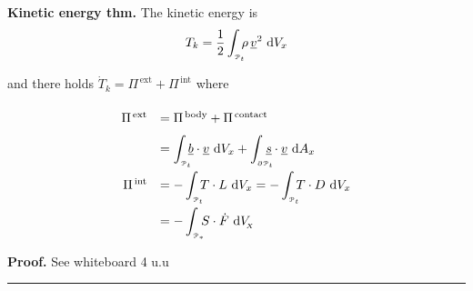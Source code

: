 \textbf{Kinetic energy thm.} The kinetic energy is
\begin{equation*}
T_k=\frac{1}{2} \int_{_{\EuScript{P}_t}}\!\!\! \rho\,\underline{v}^2\ \mathrm{d} V_x
\end{equation*}

and there holds $\boxed{\dot{T}_k=\Pi^{\,\text{ext}}+\Pi^{\,\text{int}}}$ where
\vspace{-0.8em}
\begin{equation*}
{\renewcommand*{\arraystretch}{2}
\begin{array}{rl}
\Pi^{\,\text{ext}}&=\Pi^{\,\text{body}}+\Pi^{\,\text{contact}} \\
&=\displaystyle\int_{_{\pt_t}}\!\!\! \underline{b}\cdot \underline{v}\ \de V_{x}+\int_{_{\partial \pt_t}}\!\!\!\!\! \underline{s}\cdot \underline{v}\ \de A_x \\
\Pi^{\,\text{int}}&=-\displaystyle\int_{_{\pt_t}}\!\!\! T\cdot L\ \de V_{x}=-\int_{_{\pt_t}}\!\!\! T\cdot D\ \de V_{x} \\
&=-\displaystyle\int_{_{\pt_*}}\!\!\! S\cdot \dot{F}\ \de V_{\!_X}
\end{array}}
\end{equation*}

\textbf{\color{lavender(floral)}Proof.} See whiteboard 4 u.u

\vspace{-0.5em}

\rule{0.31\textwidth}{1pt}




